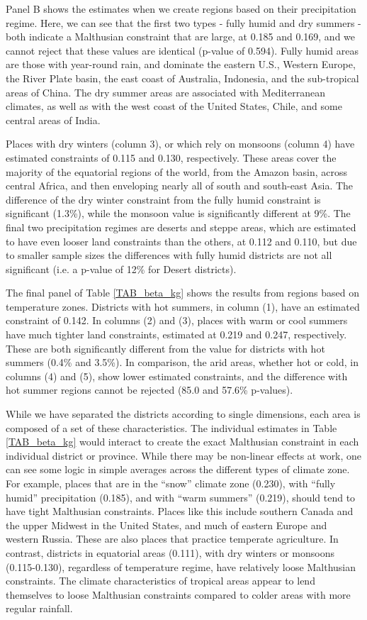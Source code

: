 \documentclass[11pt]{article}
\begin{document}
Panel B shows the estimates when we create regions based on their precipitation regime. Here, we can see that the first two types - fully humid and dry summers - both indicate a Malthusian constraint that are large, at 0.185 and 0.169, and we cannot reject that these values are identical (p-value of 0.594). Fully humid areas are those with year-round rain, and dominate the eastern U.S., Western Europe, the River Plate basin, the east coast of Australia, Indonesia, and the sub-tropical areas of China. The dry summer areas are associated with Mediterranean climates, as well as with the west coast of the United States, Chile, and some central areas of India.

Places with dry winters (column 3), or which rely on monsoons (column 4) have estimated constraints of 0.115 and 0.130, respectively. These areas cover the majority of the equatorial regions of the world, from the Amazon basin, across central Africa, and then enveloping nearly all of south and south-east Asia. The difference of the dry winter constraint from the fully humid constraint is significant (1.3\%), while the monsoon value is significantly different at 9\%. The final two precipitation regimes are deserts and steppe areas, which are estimated to have even looser land constraints than the others, at 0.112 and 0.110, but due to smaller sample sizes the differences with fully humid districts are not all significant (i.e. a p-value of 12\% for Desert districts).

The final panel of Table \ref{TAB_beta_kg} shows the results from regions based on temperature zones. Districts with hot summers, in column (1), have an estimated constraint of 0.142. In columns (2) and (3), places with warm or cool summers have much tighter land constraints, estimated at 0.219 and 0.247, respectively. These are both significantly different from the value for districts with hot summers (0.4\% and 3.5\%). In comparison, the arid areas, whether hot or cold, in columns (4) and (5), show lower estimated constraints, and the difference with hot summer regions cannot be rejected (85.0 and 57.6\% p-values).

While we have separated the districts according to single dimensions, each area is composed of a set of these characteristics. The individual estimates in Table \ref{TAB_beta_kg} would interact to create the exact Malthusian constraint in each individual district or province. While there may be non-linear effects at work, one can see some logic in simple averages across the different types of climate zone. For example, places that are in the ``snow'' climate zone (0.230), with ``fully humid'' precipitation (0.185), and with ``warm summers'' (0.219), should tend to have tight Malthusian constraints. Places like this include southern Canada and the upper Midwest in the United States, and much of eastern Europe and western Russia. These are also places that practice temperate agriculture. In contrast, districts in equatorial areas (0.111), with dry winters or monsoons (0.115-0.130), regardless of temperature regime, have relatively loose Malthusian constraints. The climate characteristics of tropical areas appear to lend themselves to loose Malthusian constraints compared to colder areas with more regular rainfall. 
\end{document}
